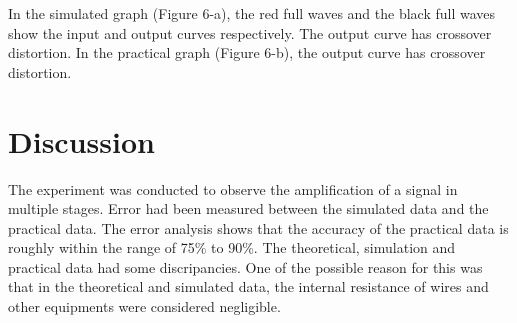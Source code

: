 \documentclass[12pt]{article}
\begin{document}
In the simulated graph (Figure 6-a), the red full waves and the black full waves show the input and output curves respectively. The output curve has crossover distortion. In the practical graph (Figure 6-b), the output curve has crossover distortion.

\section{Discussion}
The experiment was conducted to observe the amplification of a signal in multiple stages. Error had been measured between the simulated data and the practical data. The error analysis shows that the accuracy of the practical data is roughly within the range of 75\% to 90\%. The theoretical, simulation and practical data had some discripancies. One of the possible reason for this was that in the theoretical and simulated data, the internal resistance of wires and other equipments were considered negligible.
\end{document}
